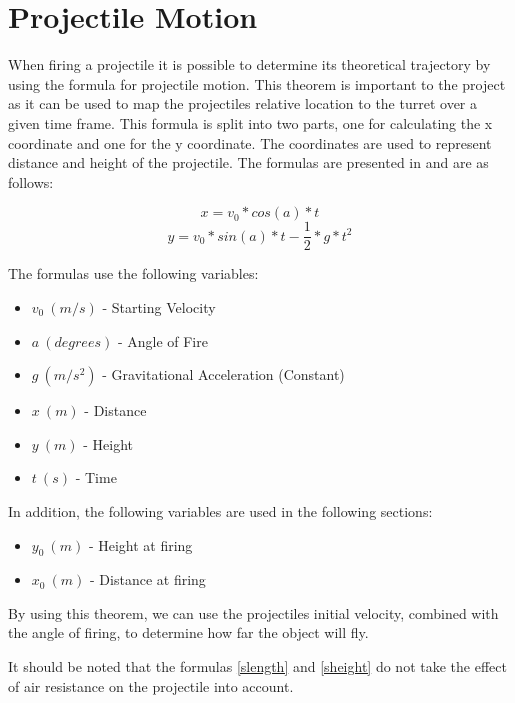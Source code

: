 \section{Projectile Motion}\label{ProjMotion}
When firing a projectile it is possible to determine its theoretical trajectory
by using the formula for projectile motion. This theorem is important to the
project as it can be used to map the projectiles relative location to the turret
over a given time frame. This formula is split into two parts, one for
calculating the x coordinate and one for the y coordinate. The coordinates are
used to represent distance and height of the projectile. The formulas are
presented in \citep[Ch. 6.2]{OrbitBA} and are as follows:

\begin{equation}\label{slength}
x=v_0*cos(a)*t
\end{equation}
\begin{equation}\label{sheight}
y=v_0*sin(a)*t-\frac{1}{2}*g*t^2
\end{equation}

The formulas use the following variables:
\begin{itemize}
  \item $v_0\ (m/s)$ - Starting Velocity
  \item $a\ (degrees)$ - Angle of Fire
  \item $g\ (m/s^2)$ - Gravitational Acceleration (Constant)
  \item $x\ (m)$ - Distance
  \item $y\ (m)$ - Height
  \item $t\ (s)$ - Time
\end{itemize}
In addition, the following variables are used in the following sections:
\begin{itemize}
  \item $y_0\ (m)$ - Height at firing
  \item $x_0\ (m)$ - Distance at firing
\end{itemize}

By using this theorem, we can use the projectiles initial velocity, combined
with the angle of firing, to determine how far the object will fly.\nl

It should be noted that the formulas \autoref{slength} and \autoref{sheight} do
not take the effect of air resistance on the projectile into account. 


